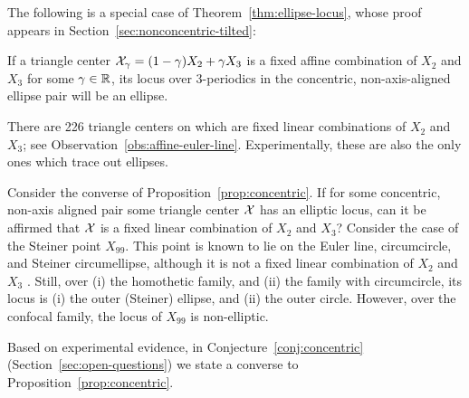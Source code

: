 The following is a special case of Theorem~\ref{thm:ellipse-locus}, whose proof appears in Section~\ref{sec:nonconcentric-tilted}:

\begin{proposition}
If a triangle center $\mathcal{X}_\gamma=(1-\gamma) X_2+ \gamma X_3$ is a fixed affine combination of $X_2$ and $X_3$ for some $\gamma\in\mathbb{R}$, its locus over 3-periodics in the concentric, non-axis-aligned ellipse pair will be an ellipse.
\label{prop:concentric}
\end{proposition}

There are 226 triangle centers on \cite{etc} which are fixed linear combinations of $X_2$ and $X_3$; see Observation~\ref{obs:affine-euler-line}. Experimentally, these are also the only ones which trace out ellipses.

Consider the converse of Proposition~\ref{prop:concentric}. If for some concentric, non-axis aligned pair some triangle center $\mathcal{X}$ has an elliptic locus, can it be affirmed that $\mathcal{X}$ is a fixed linear combination of $X_2$ and $X_3$? Consider the case of the Steiner point $X_{99}$. This point is known to lie on the Euler line, circumcircle, and Steiner circumellipse, although it is not a fixed linear combination of $X_2$ and $X_3$ \cite{etc}. Still, over (i) the homothetic family, and (ii) the family with circumcircle, its locus is (i) the outer (Steiner) ellipse, and (ii) the outer circle. However, over the confocal family, the locus of $X_{99}$ is non-elliptic.

Based on experimental evidence, in Conjecture~\ref{conj:concentric} (Section~\ref{sec:open-questions}) we state a converse to Proposition~\ref{prop:concentric}.

